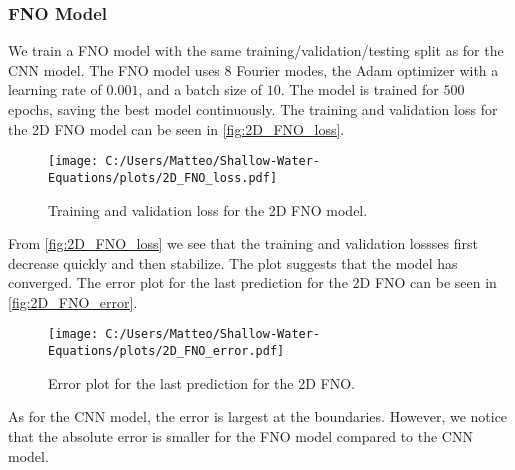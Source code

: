 \subsubsection*{FNO Model}
We train a FNO model with the same training/validation/testing split as for the CNN model.
The FNO model uses 8 Fourier modes, the Adam optimizer with a learning rate of $0.001$, and a batch size of $10$.
The model is trained for $500$ epochs, saving the best model continuously.
The training and validation loss for the 2D FNO model can be seen in \autoref{fig:2D_FNO_loss}.
\begin{figure}[H]
    \centering
    \texttt{[image: C:/Users/Matteo/Shallow-Water-Equations/plots/2D\_FNO\_loss.pdf]}
    \caption{Training and validation loss for the 2D FNO model.}\label{fig:2D_FNO_loss}
\end{figure}
From \autoref{fig:2D_FNO_loss} we see that the training and validation lossses first decrease quickly and then stabilize.
The plot suggests that the model has converged.
The error plot for the last prediction for the 2D FNO can be seen in \autoref{fig:2D_FNO_error}.
\begin{figure}[H]
    \centering
    \texttt{[image: C:/Users/Matteo/Shallow-Water-Equations/plots/2D\_FNO\_error.pdf]}
    \caption{Error plot for the last prediction for the 2D FNO.}\label{fig:2D_FNO_error}
\end{figure}
As for the CNN model, the error is largest at the boundaries.
However, we notice that the absolute error is smaller for the FNO model compared to the CNN model.

